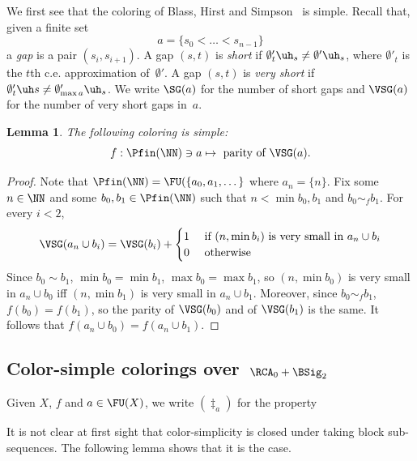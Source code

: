 \documentclass{article}
\numberwithin{theorem}{section}
\newtheorem{lemma}[theorem]{Lemma}
\begin{document}
We first see that the coloring of Blass, Hirst and Simpson~\cite{blassLogicalAnalysisTheorems1987} is simple.
Recall that, given a finite set 
$$a  = \{ s_0 < \dots < s_{n-1} \}$$
a \emph{gap} is a pair $(s_i, s_{i+1})$.
A gap $(s, t)$ is \emph{short} if $\emptyset'_t \uh_s \neq \emptyset' \uh_s$, where $\emptyset'_t$ is the $t$th c.e. approximation of~$\emptyset'$. A gap $(s, t)$ is \emph{very short} if $\emptyset'_t \uh s \neq \emptyset'_{\max a} \uh_s$. We write $\SG(a)$ for the number of short gaps and $\VSG(a)$ for the number of very short gaps in~$a$.

\begin{lemma}
The following coloring is simple:
$$f : \Pfin(\NN) \ni a \mapsto \text{ parity of } \VSG(a).$$
\end{lemma}
\begin{proof}
Note that $\Pfin(\NN) = \FU(\{ a_0, a_1, \dots \}$ where $a_n = \{n\}$.
Fix some~$n \in \NN$ and some $b_0, b_1 \in \Pfin(\NN)$ such that $n < \min b_0, b_1$ and $b_0 \sim_f b_1$.
For every $i < 2$,
$$
\VSG(a_n \cup b_i) = \VSG(b_i) + \begin{cases}
    1 & \text{ if } (n, \min b_i) \mbox{ is very small in } a_n \cup b_i\\
    0 & \text{ otherwise}
\end{cases}
$$
Since $b_0 \sim b_1$, $\min b_0 = \min b_1$, $\max b_0 = \max b_1$, so $(n, \min b_0)$ is very small in $a_n \cup b_0$ iff $(n, \min b_1)$ is very small in $a_n \cup b_1$. Moreover, since $b_0 \sim_f b_1$, $f(b_0) = f(b_1)$, so the parity of $\VSG(b_0)$ and of $\VSG(b_1)$ is the same. It follows that $f(a_n \cup b_0) = f(a_n \cup b_1)$.
\end{proof}


\subsection{Color-simple colorings over~$\RCA_0 + \BSig_2$}

Given $X$, $f$ and $a \in \FU(X)$, we write $(\ddagger_a)$ for the property 
\begin{quote}
\end{quote}

It is not clear at first sight that color-simplicity is closed under taking block sub-sequences.
The following lemma shows that it is the case.
\end{document}
